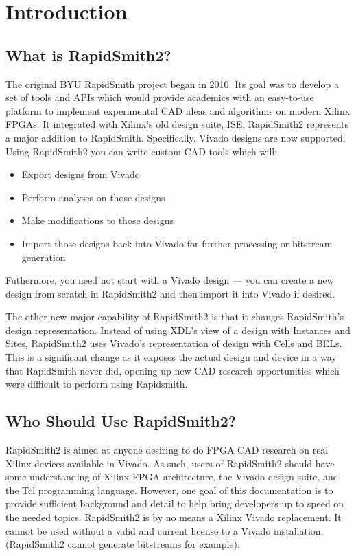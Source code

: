 \newpage
\section{Introduction}
\subsection{What is RapidSmith2?}
The original BYU RapidSmith project began in 2010. Its goal was to develop
a set of tools and APIs which would provide academics with an
easy-to-use platform to implement experimental CAD ideas and algorithms on
modern Xilinx FPGAs. It integrated with Xilinx's old design suite, ISE.
RapidSmith2 represents a major addition to RapidSmith. Specifically, Vivado
designs are now supported. Using RapidSmith2 you can write custom CAD tools
which will:

\begin{itemize}
  \item Export designs from Vivado
  \item Perform analyses on those designs
  \item Make modifications to those designs
  \item Import those designs back into Vivado for further processing or
  bitstream generation
\end{itemize}
Futhermore, you need not start with a Vivado design --- 
you can create a new design from scratch in RapidSmith2 and then import it into Vivado
if desired.

The other new major capability of RapidSmith2 is that it changes RapidSmith's design
representation. Instead of using XDL's view of a design with Instances and
Sites, RapidSmith2 uses Vivado's representation of design with Cells and BELs. This
is a significant change as it exposes the actual design and device in a way
that RapidSmith never did, opening up new CAD research opportunities which were
difficult to perform using Rapidsmith.
       
\subsection{Who Should Use RapidSmith2?}
RapidSmith2 is aimed at anyone desiring to do FPGA CAD research on real Xilinx devices
available in Vivado. As such, users of RapidSmith2 should have some understanding of
Xilinx FPGA architecture, the Vivado design suite, and the Tcl programming
language. However, one goal of this documentation is to provide sufficient
background and detail to help bring developers up to speed on the needed
topics. RapidSmith2 is by no means a Xilinx Vivado replacement. It cannot be used
without a valid and current license to a Vivado installation (RapidSmith2
cannot generate bitstreams for example).

